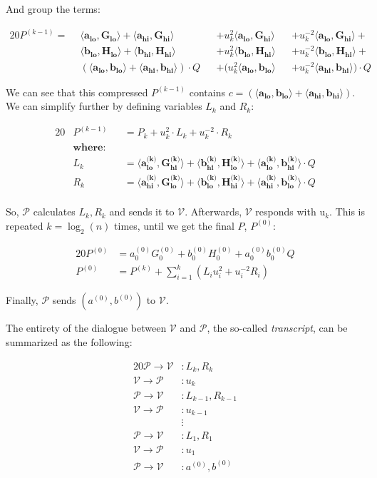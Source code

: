 \documentclass{article}
\newcommand{\eq}[1]{\begin{alignat*}{20}#1\end{alignat*}}
\renewcommand{\vec}[1]{\boldsymbol{#1}}
\newcommand{\ran}[1]{\mathrm{#1}}
\newcommand{\V}{\mathcal{V}}
\renewcommand{\P}{\mathcal{P}}
\newcommand{\dotp}[2]{\langle #1, #2 \rangle}
\newcommand{\opn}[1]{\operatorname{#1}}
\newcommand{\veclo}[1]{\vec{#1_{\opn{lo}}}}
\newcommand{\vechi}[1]{\vec{#1_{\opn{hi}}}}
\begin{document}
And group the terms:

\eq{
	P^{(k-1)} = \: \:
	        &\dotp{\veclo{a}}{\veclo{G}}            +
	         \dotp{\vechi{a}}{\vechi{G}}          &&+
	u^2_k    \dotp{\veclo{a}}{\vechi{G}}          &&+
	u^{-2}_k \dotp{\veclo{a}}{\vechi{G}}            +\\
	        &\dotp{\veclo{b}}{\veclo{H}}            +
	         \dotp{\vechi{b}}{\vechi{H}}          &&+
	u^2_k    \dotp{\veclo{b}}{\vechi{H}}          &&+
	u^{-2}_k \dotp{\veclo{b}}{\vechi{H}}            +\\
	       &(\dotp{\veclo{a}}{\veclo{b}}            +
		       \dotp{\vechi{a}}{\vechi{b}}) \cdot Q &&+
	(u^2_k   \dotp{\veclo{a}}{\veclo{b}}          &&+
	u^{-2}_k \dotp{\vechi{a}}{\vechi{b}}) \cdot Q
}

We can see that this compressed $P^{(k-1)}$ contains $c =
(\dotp{\veclo{a}}{\veclo{b}} + \dotp{\vechi{a}}{\vechi{b}})$. We can
simplify further by defining variables $L_k$ and $R_k$:

\eq{
	&P^{(k-1)} &&= P_k + u^2_k \cdot L_k + u^{-2}_k \cdot R_k \\
	&\textbf{where:} \\
	&L_k     &&= \dotp{\veclo{a^{\text{(k)}}}}{\vechi{G^{\text{(k)}}}} +
	             \dotp{\vechi{b^{\text{(k)}}}}{\veclo{H^{\text{(k)}}}} + 
	             \dotp{\veclo{a^{\text{(k)}}}}{\vechi{b^{\text{(k)}}}} \cdot Q \\
	&R_k     &&= \dotp{\vechi{a^{\text{(k)}}}}{\veclo{G^{\text{(k)}}}} +
	             \dotp{\veclo{b^{\text{(k)}}}}{\vechi{H^{\text{(k)}}}} +
	             \dotp{\vechi{a^{\text{(k)}}}}{\veclo{b^{\text{(k)}}}} \cdot Q \\
}

So, $\P$ calculates $L_k, R_k$ and sends it to $\V$. Afterwards,
$\V$ responds with $\ran{u}_k$. This is repeated $k = \log_2(n)$ times,
until we get the final $P$, $P^{(0)}$:

\eq{
	P^{(0)} &= a^{(0)}_0 G^{(0)}_0 + b^{(0)}_0 H^{(0)}_0 + a^{(0)}_0 b^{(0)}_0 Q \\
	P^{(0)} &= P^{(k)} + \sum^k_{i=1}(L_i u^2_i + u^{-2}_i R_i)
}

Finally, $\P$ sends $(a^{(0)}, b^{(0)})$ to $\V$.

\newpage

The entirety of the dialogue between $\V$ and $\P$,
the so-called \textit{transcript}, can be summarized as the following:

\eq{
	\P \rightarrow \V &: L_k, R_k \\
	\V \rightarrow \P &: u_k \\[5pt]
	\P \rightarrow \V &: L_{k-1}, R_{k-1} \\
	\V \rightarrow \P &: u_{k-1} \\[-5pt]
	                  &\vdots \\
	\P \rightarrow \V &: L_{1}, R_{1} \\
	\V \rightarrow \P &: u_{1} \\[5pt]
	\P \rightarrow \V &: a^{(0)}, b^{(0)} \\
}
\end{document}
